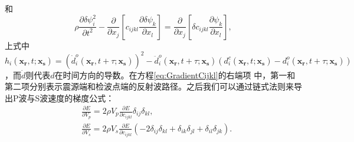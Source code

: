 和
\begin{equation}
    \rho \frac{\partial \delta \psi^2_i}{\partial t^2}  -
    \frac{\partial}{\partial x_j}\left[ 
        c_{ijkl}\frac{\partial \delta \psi_{k}}{\partial 
        x_l}\right]=\frac{\partial}{\partial x_j}\left[\delta c_{ijkl}\frac{\partial
        \psi_{k}}{\partial x_l}\right], 
    \label{eq:AdjointDeltaWE} 
\end{equation}
上式中$h_i(\mathbf{x_r},t;\mathbf{x_s})=(\dot{d}^o_i(\mathbf{x_r},t+\tau;\mathbf{x_s}))^2-\ddot{d}^o_i(\mathbf{x_r},t+\tau;\mathbf{x_s})
(d^c_i(\mathbf{x_r},t;\mathbf{x_s})-d^o_i(\mathbf{x_r},t+\tau;\mathbf{x_s}))$，而$\dot{d}$则代表$d$在时间方向的导数。在方程\eqref{eq:GradientCijkl}的右端项
中，第一和第二项分别表示震源端和检波点端的反射波路径。之后我们可以通过链式法则来导出P波与S波速度的梯度公式：
\begin{equation}
\begin{split}
    &\frac{\partial E}{\partial V_p}=2\rho V_p\frac{\partial E}{\partial
        c_{ijkl}}\delta_{ij}\delta_{kl}, \\
    &\frac{\partial E}{\partial V_s}=2\rho V_s\frac{\partial
    E}{\partial c_{ijkl}}(-2\delta_{ij}\delta_{kl}+\delta_{ik}\delta_{jl}+
    \delta_{il}\delta_{jk}).
\end{split}
    \label{eq:GradientVel}
\end{equation}
